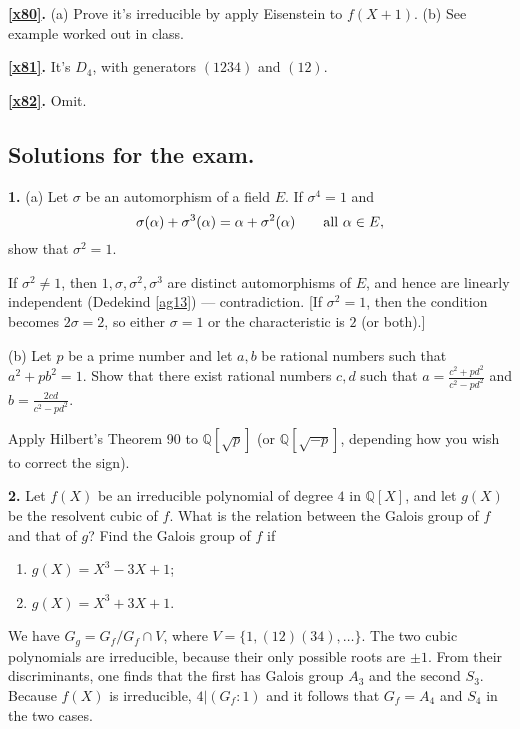 \documentclass[a4paper,11pt,final,openany]{memoir}
\theoremstyle{nonumberplain}
\begin{document}
\medskip\noindent\textbf{\ref{x80}.} (a) Prove it's irreducible by apply
Eisenstein to $f(X+1)$. (b) See example worked out in class.

\medskip\noindent\textbf{\ref{x81}.} It's $D_{4}$, with generators $(1234)$
and $(12)$.

\medskip\noindent\textbf{\ref{x82}.} Omit.

\subsection{Solutions for the exam.}

\medskip\noindent\textbf{1.} (a) Let $\sigma$ be an automorphism of a field
$E$. If $\sigma^{4}=1$ and
\[
\sigma(\alpha)+\sigma^{3}(\alpha)=\alpha+\sigma^{2}(\alpha)\qquad
\text{\textrm{all }} \alpha\in E,
\]
show that $\sigma^{2}=1$.

If $\sigma^{2}\neq1$, then $1,\sigma,\sigma^{2},\sigma^{3}$ are distinct
automorphisms of $E$, and hence are linearly independent (Dedekind \ref{ag13})
--- contradiction. [If $\sigma^{2}=1$, then the condition becomes $2\sigma=2$,
so either $\sigma=1$ or the characteristic is $2$ (or both).]

\noindent(b) Let $p$ be a prime number and let $a,b$ be rational numbers such
that $a^{2}+pb^{2}=1$. Show that there exist rational numbers $c,d$ such that
$a=\frac{c^{2}+pd^{2}}{c^{2}-pd^{2}}$ and $b=\frac{2cd}{ c^{2}-pd^{2}}$.

Apply Hilbert's Theorem 90 to ${\mathbb{Q}}[\sqrt p]$ (or ${\mathbb{Q}}[\sqrt{
-p}]$, depending how you wish to correct the sign). \bigskip

\medskip\noindent\textbf{2.} Let $f(X)$ be an irreducible polynomial of degree
$4$ in ${\mathbb{Q}}[X]$, and let $g(X)$ be the resolvent cubic of $f$. What
is the relation between the Galois group of $f$ and that of $g$? Find the
Galois group of $f$ if

\begin{enumerate}
\item $g(X)=X^{3}-3X+1$;

\item $g(X)=X^{3}+3X+1$.
\end{enumerate}

We have $G_{g}=G_{f}/G_{f}\cap V$, where $V=\{1,(12)(34),\ldots\}$. The two
cubic polynomials are irreducible, because their only possible roots are
$\pm1$. From their discriminants, one finds that the first has Galois group
$A_{3}$ and the second $S_{3}$. Because $f(X)$ is irreducible, $4|(G_{f}%
\colon1)$ and it follows that $G_{f}=A_{4}$ and $S_{4}$ in the two cases.
\end{document}
